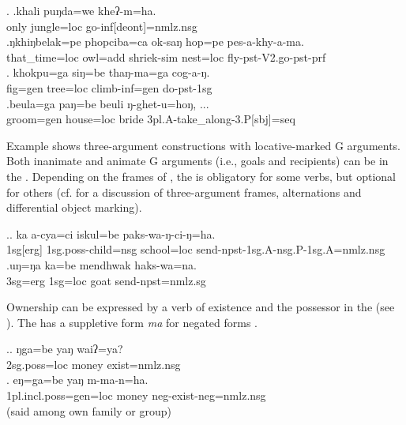 	 \ex. \ag.khali puŋda=we  kheʔ-m=ha.\\
	only jungle{\sc =loc} go-{\sc inf[deont]=nmlz.nsg}		\\
	  
\bg.ŋkhiŋbelak=pe   phopciba=ca        ok-saŋ          hop=pe     pes-a-khy-a-ma.\\
that\_time{\sc =loc} owl{\sc =add} shriek{\sc -sim} nest{\sc =loc} fly{\sc [3sg]-pst-V2.go-pst-prf}\\
	 
	\bg. khokpu=ga      siŋ=be    thaŋ-ma=ga       cog-a-ŋ.\\
fig{\sc =gen} tree{\sc =loc} climb{\sc -inf=gen} do{\sc -pst-1sg}\\
	 
	\bg.beula=ga    paŋ=be     beuli ŋ-ghet-u=hoŋ, ...\\
	groom{\sc =gen} house{\sc =loc} bride {\sc 3pl.A-}take\_along{\sc -3.P[sbj]=seq}\\


Example \Next shows three-argument constructions with loca\-tive-mar\-ked G arguments. Both inanimate and animate G arguments  (i.e., goals and recipients) can be in the . Depending on the frames of , the  is obligatory for some verbs, but optional for others (cf.  for a discussion of three-argument frames, alternations and differential object marking).
 
\ex.\ag. ka a-cya=ci iskul=be paks-wa-ŋ-ci-ŋ=ha.\\
	{\sc 1sg[erg]} {\sc 1sg.poss}-child{\sc =nsg} school{\sc =loc} send-{\sc npst-1sg.A-nsg.P-1sg.A=nmlz.nsg}\\
	\bg.uŋ=ŋa ka=be mendhwak haks-wa=na.\\
	{\sc 3sg=erg} {\sc 1sg=loc} goat send{\sc [3sg.A;3.P]-npst=nmlz.sg}\\

Ownership can be expressed by a verb of existence and the possessor in the  (see \Next). The  has a suppletive form \emph{ma} for negated forms \Next[b]. 

\ex.\ag. ŋga=be yaŋ waiʔ=ya?\\
{\sc 2sg.poss=loc} money exist{\sc [3sg;npst]=nmlz.nsg}\\
\bg. eŋ=ga=be yaŋ m-ma-n=ha.\\
		{\sc 1pl.incl.poss=gen=loc} money {\sc neg-}exist{\sc [3;npst]-neg=nmlz.nsg}	\\
	 (said among own family or group)

